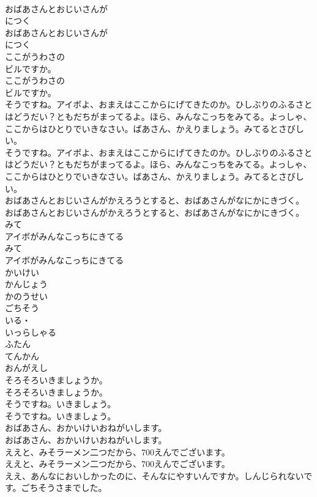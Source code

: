 \documentclass[8pt]{extreport}
\begin{document}
\begin{CJK}{UTF8}{min}
\\	おばあさんとおじいさんが
\\	につく
\\	おばあさんとおじいさんが
\\	につく
\\	ここがうわさの
\\	ビルですか。
\\	ここがうわさの
\\	ビルですか。
\\	そうですね。アイボよ、おまえはここからにげてきたのか。ひしぶりのふるさとはどうだい？ともだちがまってるよ。ほら、みんなこっちをみてる。よっしゃ、ここからはひとりでいきなさい。ばあさん、かえりましょう。みてるとさびしい。
\\	そうですね。アイボよ、おまえはここからにげてきたのか。ひしぶりのふるさとはどうだい？ともだちがまってるよ。ほら、みんなこっちをみてる。よっしゃ、ここからはひとりでいきなさい。ばあさん、かえりましょう。みてるとさびしい。
\\	おばあさんとおじいさんがかえろうとすると、おばあさんがなにかにきづく。
\\	おばあさんとおじいさんがかえろうとすると、おばあさんがなにかにきづく。
\\	みて
\\	アイボがみんなこっちにきてる
\\	みて
\\	アイボがみんなこっちにきてる
\\	かいけい
\\	かんじょう
\\	かのうせい
\\	ごちそう
\\	いる・
\\	いっらしゃる
\\	ふたん
\\	てんかん
\\	おんがえし
\\	そろそろいきましょうか。
\\	そろそろいきましょうか。
\\	そうですね。いきましょう。
\\	そうですね。いきましょう。
\\	おばあさん、おかいけいおねがいします。
\\	おばあさん、おかいけいおねがいします。
\\	ええと、みそラーメン二つだから、700えんでございます。
\\	ええと、みそラーメン二つだから、700えんでございます。
\\	ええ、あんなにおいしかったのに、そんなにやすいんですか。しんじられないです。ごちそうさまでした。

\end{CJK}
\end{document}
